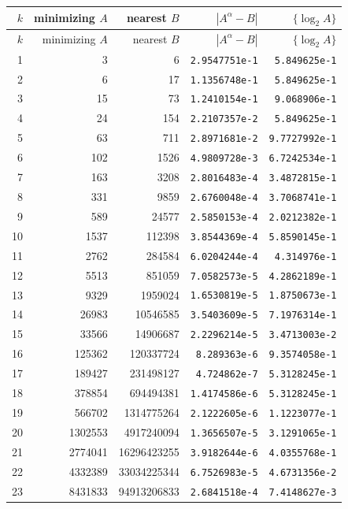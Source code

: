 \documentclass[11pt]{article}
\newcommand{\num}[1]{\texttt{#1}}
\theoremstyle{definition}
\begin{document}
\begin{longtable}{r r r r r}
\toprule
$k$ & minimizing $A$ & nearest $B$ & $|A^\alpha-B|$ & $\{\log_2 A\}$\\
\midrule
\endfirsthead
\toprule
$k$ & minimizing $A$ & nearest $B$ & $|A^\alpha-B|$ & $\{\log_2 A\}$\\
\midrule
\endhead
1 & 3 & 6 & \num{2.9547751e-1} & \num{5.849625e-1}\\
2 & 6 & 17 & \num{1.1356748e-1} & \num{5.849625e-1}\\
3 & 15 & 73 & \num{1.2410154e-1} & \num{9.068906e-1}\\
4 & 24 & 154 & \num{2.2107357e-2} & \num{5.849625e-1}\\
5 & 63 & 711 & \num{2.8971681e-2} & \num{9.7727992e-1}\\
6 & 102 & 1526 & \num{4.9809728e-3} & \num{6.7242534e-1}\\
7 & 163 & 3208 & \num{2.8016483e-4} & \num{3.4872815e-1}\\
8 & 331 & 9859 & \num{2.6760048e-4} & \num{3.7068741e-1}\\
9 & 589 & 24577 & \num{2.5850153e-4} & \num{2.0212382e-1}\\
10 & 1537 & 112398 & \num{3.8544369e-4} & \num{5.8590145e-1}\\
11 & 2762 & 284584 & \num{6.0204244e-4} & \num{4.314976e-1}\\
12 & 5513 & 851059 & \num{7.0582573e-5} & \num{4.2862189e-1}\\
13 & 9329 & 1959024 & \num{1.6530819e-5} & \num{1.8750673e-1}\\
14 & 26983 & 10546585 & \num{3.5403609e-5} & \num{7.1976314e-1}\\
15 & 33566 & 14906687 & \num{2.2296214e-5} & \num{3.4713003e-2}\\
16 & 125362 & 120337724 & \num{8.289363e-6} & \num{9.3574058e-1}\\
17 & 189427 & 231498127 & \num{4.724862e-7} & \num{5.3128245e-1}\\
18 & 378854 & 694494381 & \num{1.4174586e-6} & \num{5.3128245e-1}\\
19 & 566702 & 1314775264 & \num{2.1222605e-6} & \num{1.1223077e-1}\\
20 & 1302553 & 4917240094 & \num{1.3656507e-5} & \num{3.1291065e-1}\\
21 & 2774041 & 16296423255 & \num{3.9182644e-6} & \num{4.0355768e-1}\\
22 & 4332389 & 33034225344 & \num{6.7526983e-5} & \num{4.6731356e-2}\\
23 & 8431833 & 94913206833 & \num{2.6841518e-4} & \num{7.4148627e-3}\\
\bottomrule
\end{longtable}
\end{document}
